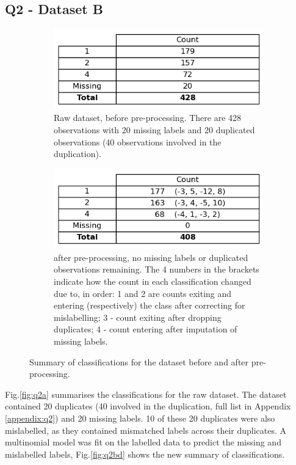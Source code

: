 
\subsection{Q2 - Dataset B}\label{subsec:dataset-b}
    \begin{figure}
    \centering
    \begin{subfigure}{0.9\textwidth}
      \centering
      \includegraphics[width=.55\linewidth]{./figures/q2a}
      \caption{Raw  dataset, before pre-processing. There are 428 observations with 20 missing
        labels and 20 duplicated observations (40 observations involved in the duplication).}
      \label{fig:q2a}
    \end{subfigure}%
    \hfill
    \begin{subfigure}{0.9\textwidth}
      \centering
      \includegraphics[width=0.55\linewidth]{./figures/q2b_q2d}
      \caption{ after pre-processing, no missing labels or duplicated observations remaining.
        The 4 numbers in the brackets indicate how the count in each classification changed due to, in order: 1 and 2
        are counts exiting and entering (respectively) the class after correcting for mislabelling; 3 -
        count exiting after dropping duplicates; 4 - count entering after imputation of missing labels.}
      \label{fig:q2bd}
    \end{subfigure}
    \caption{Summary of classifications for the  dataset before and after pre-processing.}
    \label{fig:q2abd}
    \end{figure}

    Fig.\eqref{fig:q2a} summarises the classifications for the raw  dataset.
    The dataset contained 20 duplicates (40 involved in the duplication, full list in Appendix \ref{appendix:q2}) and
    20 missing labels.
    10 of these 20 duplicates were also mislabelled, as they contained mismatched labels across their duplicates.
    A multinomial  model was fit on the labelled data to predict the missing and mislabelled
    labels, Fig.\eqref{fig:q2bd} shows the new summary of classifications.

